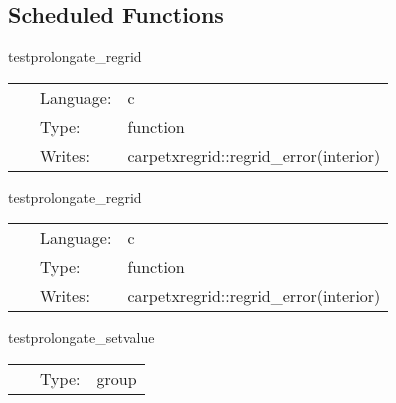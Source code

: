\subsection*{Scheduled Functions}
\vspace{5mm}


\hspace{5mm} testprolongate\_regrid 

\hspace{5mm}{\it set up test grid } 


\hspace{5mm}

 \begin{tabular*}{160mm}{cll} 
~ & Language:  & c \\ 
~ & Type:  & function \\ 
~ & Writes:  & carpetxregrid::regrid\_error(interior) \\ 
\end{tabular*} 


\vspace{5mm}


\hspace{5mm} testprolongate\_regrid 

\hspace{5mm}{\it set up test grid } 


\hspace{5mm}

 \begin{tabular*}{160mm}{cll} 
~ & Language:  & c \\ 
~ & Type:  & function \\ 
~ & Writes:  & carpetxregrid::regrid\_error(interior) \\ 
\end{tabular*} 


\vspace{5mm}


\hspace{5mm} testprolongate\_setvalue 

\hspace{5mm}{\it set up test data } 


\hspace{5mm}

 \begin{tabular*}{160mm}{cll} 
~ & Type:  & group \\ 
\end{tabular*} 


